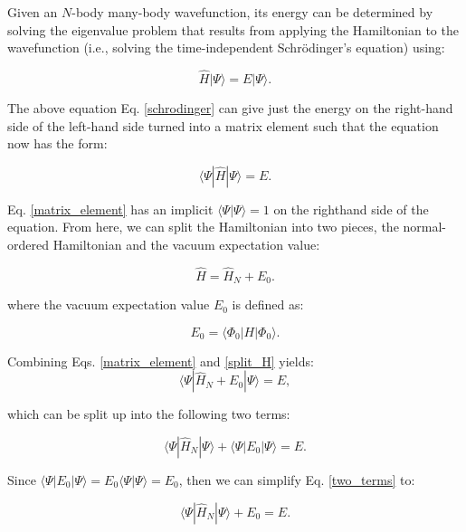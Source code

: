 Given an $N$-body many-body wavefunction, its energy can be determined by solving the eigenvalue problem that results from applying the Hamiltonian to the wavefunction (i.e., solving the time-independent Schr\"{o}dinger's equation) using:

\begin{equation} \label{schrodinger}
	\hat{H}|\Psi\rangle = E|\Psi\rangle.
\end{equation}

The above equation Eq. \ref{schrodinger} can give just the energy on the right-hand side of the left-hand side turned into a matrix element such that the equation now has the form:
 
\begin{equation} \label{matrix_element}
	\langle \Psi | \hat{H} | \Psi \rangle = E.
\end{equation}

Eq. \ref{matrix_element} has an implicit $\langle\Psi|\Psi\rangle = 1$ on the righthand side of the equation. From here, we can split the Hamiltonian into two pieces, the normal-ordered Hamiltonian and the vacuum expectation value:

\begin{equation}\label{split_H}
	\hat{H} = \hat{H}_N + E_0.
\end{equation}

where the vacuum expectation value $E_0$ is defined as:

\begin{equation}\label{vacuum_expectation}
	E_0 = \langle \Phi_0 | H | \Phi_0 \rangle.
\end{equation}

Combining Eqs. \ref{matrix_element} and \ref{split_H} yields:
\begin{equation}
	\langle \Psi | \hat{H}_N + E_0 | \Psi \rangle = E,
\end{equation}

which can be split up into the following two terms:

\begin{equation} \label{two_terms}
	\langle \Psi | \hat{H}_N | \Psi \rangle + \langle \Psi | E_0 | \Psi \rangle = E.
\end{equation}

Since $\langle\Psi | E_0 | \Psi\rangle = E_0\langle\Psi |\Psi\rangle = E_0$, then we can simplify Eq. \ref{two_terms} to:

\begin{equation}\label{two_terms_2}
	\langle \Psi | \hat{H}_N | \Psi \rangle + E_0 = E.
\end{equation}

